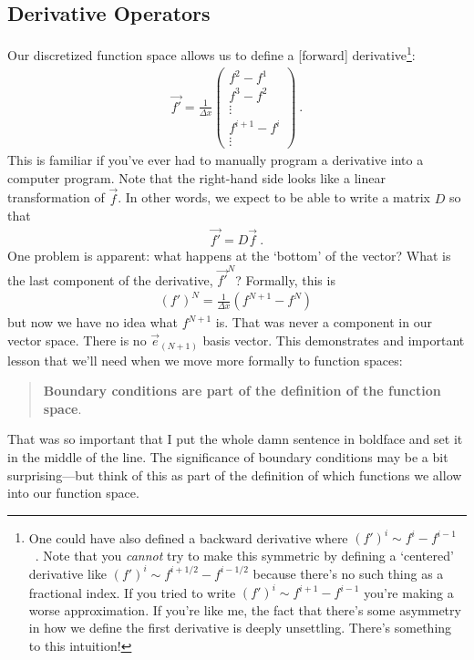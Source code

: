 \documentclass[
  11pt,
	colorful,
	raggedright,
]{tufte-style-thesis-flip}
\begin{document}
\subsection{Derivative Operators}

Our discretized function space allows us to define a [forward] derivative\footnote{One could have also defined a backward derivative where $(f')^i \sim f^{i}-f^{i-1}$ \ . Note that you \emph{cannot} try to make this symmetric by defining a `centered' derivative like $(f')^i \sim f^{i+1/2}-f^{i-1/2}$ because there's no such thing as a fractional index. If you tried to write $(f')^i\sim f^{i+1}-f^{i-1}$ you're making a worse approximation. If you're like me, the fact that there's some asymmetry in how we define the first derivative is deeply unsettling. There's something to this intuition!}:
\begin{align}
  \vec{f'} =
  \frac{1}{\Delta x}
  \begin{pmatrix}
    f^2 - f^1 \\
    f^3 - f^2 \\
    \vdots
    \\
    f^{i+1}-f^i
    \\
    \vdots
  \end{pmatrix} \ .
\end{align}
This is familiar if you’ve ever had to manually program a derivative into a computer program. Note that the right-hand side looks like a linear transformation of $\vec{f}$. In other words, we expect to be able to write a matrix $D$ so that
\begin{align}
  \vec{f'} = D\vec{f} \ .
\end{align}
One problem is apparent: what happens at the `bottom’ of the vector? What is the last component of the derivative, $\vec{f'}^N$? Formally, this is
\begin{align}
  {(f')}^N = \frac{1}{\Delta x}(f^{N+1} - f^N) \,
\end{align}
but now we have no idea what $f^{N+1}$ is. That was never a component in our vector space. There is no $\vec{e}_{(N+1)}$ basis vector. 
%
This demonstrates and important lesson that we’ll need when we move more formally to function spaces:
\begin{quote}
\textbf{Boundary conditions are part of the definition of the function space}.   
\end{quote}
That was so important that I put the whole damn sentence in boldface and set it in the middle of the line. The significance of boundary conditions may be a bit surprising---but think of this as part of the definition of which functions we allow into our function space. 
\end{document}
